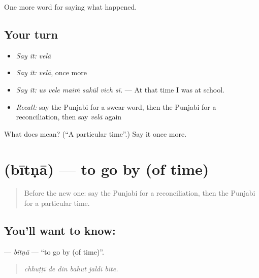 \begin{grammarlens}[title={What you've built}]
One more word for saying what happened.
\end{grammarlens}

\subsection*{Your turn}
\begin{itemize}
\raggedright
  \item \emph{Say it:} \emph{velā}
  \item \emph{Say it:} \emph{velā}, once more
  \item \emph{Say it:} \emph{us vele maiṁ sakūl vich sī.} — At that time I was at school.
  \item \emph{Recall:} say the Punjabi for a swear word, then the Punjabi for a reconciliation, then say \emph{velā} again
\end{itemize}

\begin{tcolorbox}[breakable,colback=teal!4,colframe=teal!35!black,title={Before you move on}]
What does  mean? (\textquotedblleft{}A particular time\textquotedblright{}.) Say it once more.
\end{tcolorbox}
\section[\texorpdfstring{\pa{ਬੀਤਣਾ} (bītṇā)}{ਬੀਤਣਾ (bītṇā)}]{ (bītṇā) — to go by (of time)}

\label{lesson:PA-C317-bitna}



\begin{quote}
Before the new one: say the Punjabi for a reconciliation, then the Punjabi for a particular time.
\end{quote}

\subsection*{You'll want to know: }
\textbf{} — \emph{bītṇā} — \textquotedblleft{}to go by (of time)\textquotedblright{}.

\begin{quote}
     
\end{quote}

\begin{quote}
\emph{chhuṭṭī de din bahut jaldī bīte.}
\end{quote}

